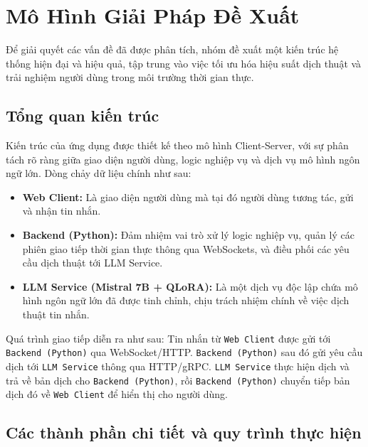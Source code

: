 \section{Mô Hình Giải Pháp Đề Xuất}

Để giải quyết các vấn đề đã được phân tích, nhóm đề xuất một kiến trúc hệ thống hiện đại và hiệu quả, tập trung vào việc tối ưu hóa hiệu suất dịch thuật và trải nghiệm người dùng trong môi trường thời gian thực.

\subsection{Tổng quan kiến trúc}
Kiến trúc của ứng dụng được thiết kế theo mô hình Client-Server, với sự phân tách rõ ràng giữa giao diện người dùng, logic nghiệp vụ và dịch vụ mô hình ngôn ngữ lớn. Dòng chảy dữ liệu chính như sau:
\begin{itemize}
    \item \textbf{Web Client:} Là giao diện người dùng mà tại đó người dùng tương tác, gửi và nhận tin nhắn.
    \item \textbf{Backend (Python):} Đảm nhiệm vai trò xử lý logic nghiệp vụ, quản lý các phiên giao tiếp thời gian thực thông qua WebSockets, và điều phối các yêu cầu dịch thuật tới LLM Service.
    \item \textbf{LLM Service (Mistral 7B + QLoRA):} Là một dịch vụ độc lập chứa mô hình ngôn ngữ lớn đã được tinh chỉnh, chịu trách nhiệm chính về việc dịch thuật tin nhắn.
\end{itemize}
Quá trình giao tiếp diễn ra như sau: Tin nhắn từ \texttt{Web Client} được gửi tới \texttt{Backend (Python)} qua WebSocket/HTTP. \texttt{Backend (Python)} sau đó gửi yêu cầu dịch tới \texttt{LLM Service} thông qua HTTP/gRPC. \texttt{LLM Service} thực hiện dịch và trả về bản dịch cho \texttt{Backend (Python)}, rồi \texttt{Backend (Python)} chuyển tiếp bản dịch đó về \texttt{Web Client} để hiển thị cho người dùng.


\subsection{Các thành phần chi tiết và quy trình thực hiện}

